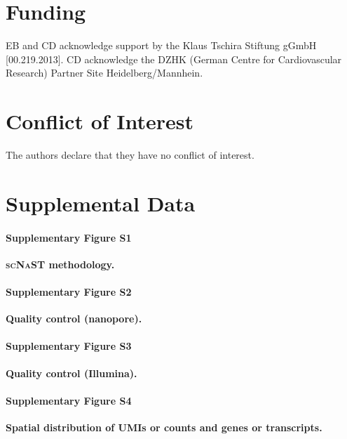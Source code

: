 \documentclass[utf8]{FrontiersinHarvard} %
\newcommand{\scnast}{\textsc{scNaST}\xspace}
\begin{document}
\section*{Funding}
EB and CD acknowledge support by the Klaus Tschira Stiftung gGmbH [00.219.2013]. 
CD acknowledge the DZHK (German Centre for Cardiovascular Research) Partner Site Heidelberg/Mannhein.


\section*{Conflict of Interest}
The authors declare that they have no conflict of interest.

\section*{Supplemental Data}

\paragraph*{Supplementary Figure S1}
\label{fig:S1}
{\bf \scnast methodology.}

\paragraph*{Supplementary Figure S2}
\label{fig:S2}
{\bf Quality control (nanopore).}

\paragraph*{Supplementary Figure S3}
\label{fig:S3}
{\bf Quality control (Illumina).}

\paragraph*{Supplementary Figure S4}
\label{fig:S4}
{\bf Spatial distribution of UMIs or counts and genes or transcripts.}
\end{document}
